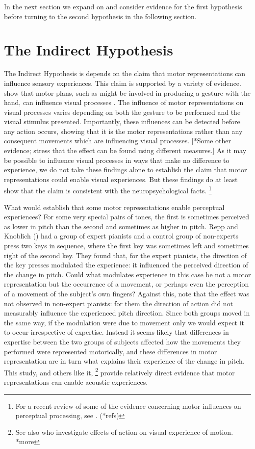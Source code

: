 \documentclass[12pt,\papersize]{extarticle}
\begin{document}
In the next section we expand on and consider evidence for the first hypothesis before turning to the second hypothesis in the following section.


\section{The Indirect Hypothesis}
The Indirect Hypothesis is depends on the claim that motor representations can influence sensory experiences.  This claim is supported by a variety of evidence.  \citet{bortoletto:2011_action} show that motor plans, such as might be involved in producing a gesture with the hand, can influence visual processes \citep{bortoletto:2011_action}. The influence of motor representations on visual processes varies depending on both the gesture to be performed and the visual stimulus presented. Importantly, these influences can be detected before any action occurs, showing that it is the motor representations rather than any consequent movements which are influencing visual processes. [*Some other evidence; stress that the effect can be found using different measures.]  As it may be possible to influence visual processes in ways that make no difference to experience, we do not take these findings alone to establish the claim that motor representations could enable visual experiences.  But these findings do at least show that the claim is consistent with the neuropsychological facts.%
\footnote{
For a recent review of some of the evidence concerning motor influences on perceptual processing, see \citet{halasz:2012_unconscious}. (*refs)
}  

What would establish that some motor representations enable perceptual experiences? For some very special pairs of tones, the first is sometimes perceived as lower in pitch than the second and sometimes as higher in pitch.  Repp and Knoblich (\citeyear{repp:2007_action}) had a group of expert pianists and a control group of non-experts press two keys in sequence, where the first key was sometimes left and sometimes right of the second key.  They found that, for the expert pianists, the direction of the key presses modulated the experience: it influenced the perceived direction of the change in pitch. Could what modulates experience in this case be not a motor representation but the occurrence of a movement, or perhaps even the perception of a movement of the subject's own fingers?  Against this, note that the effect was not observed in non-expert pianists: for them the direction of action did not measurably influence the experienced pitch direction. Since both groups moved in the same way, if the modulation were due to movement only we would expect it to occur irrespective of expertise. Instead it seems likely that differences in expertise between the two groups of subjects affected how the movements they performed were represented motorically, and these differences in motor representation are in turn what explains their experience of the change in pitch.  This study, and others like it,%
\footnote{
See also \citet{zwickel:2010_interference} who investigate effects of action on visual experience of motion.  *more
} 
provide relatively direct evidence that motor representations can enable acoustic experiences.
\end{document}
